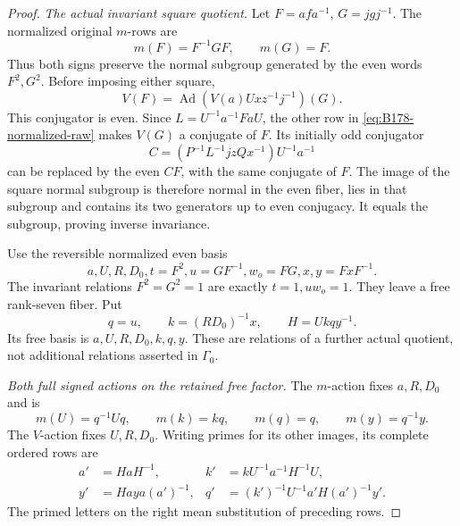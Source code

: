 \begin{proof}
\emph{The actual invariant square quotient.}
Let \(F=afa^{-1}\), \(G=jgj^{-1}\). The normalized original \(m\)-rows are
\[
                     m(F)=F^{-1}GF,\qquad m(G)=F.
\]
Thus both signs preserve the normal subgroup generated by the even
words \(F^2,G^2\). Before imposing either square,
\[
                     V(F)=\operatorname{Ad}(V(a)Uxz^{-1}j^{-1})(G).
\]
This conjugator is even. Since \(L=U^{-1}a^{-1}FaU\), the other row
in \eqref{eq:B178-normalized-raw} makes \(V(G)\) a conjugate of \(F\).
Its initially odd conjugator
\[
                  C=(P^{-1}L^{-1}jzQx^{-1})U^{-1}a^{-1}
\]
can be replaced by the even \(CF\), with the same conjugate of \(F\).
The image of the square normal subgroup is therefore normal in the
even fiber, lies in that subgroup and contains its two generators up
to even conjugacy. It equals the subgroup, proving inverse invariance.

Use the reversible normalized even basis
\[
 a,U,R,D_0,t=F^2,u=GF^{-1},w_o=FG,x,y=FxF^{-1}.
\]
The invariant relations \(F^2=G^2=1\) are exactly \(t=1,uw_o=1\).
They leave a free rank-seven fiber. Put
\[
                 q=u,\qquad k=(RD_0)^{-1}x,\qquad H=Ukqy^{-1}.
\]
Its free basis is \(a,U,R,D_0,k,q,y\). These are relations of a further
actual quotient, not additional relations asserted in \(\Gamma _0\).

\emph{Both full signed actions on the retained free factor.}
The \(m\)-action fixes \(a,R,D_0\) and is
\begin{equation}\label{eq:B178-m-action}
 m(U)=q^{-1}Uq,\qquad m(k)=kq,\qquad m(q)=q,\qquad m(y)=q^{-1}y.
\end{equation}
The \(V\)-action fixes \(U,R,D_0\). Writing primes for its other
images, its complete ordered rows are
\begin{equation}\label{eq:B178-V-action}
\begin{aligned}
 a'&=HaH^{-1},\qquad &k'&=kU^{-1}a^{-1}H^{-1}U,\\
 y'&=Hay a(a')^{-1},&q'&=(k')^{-1}U^{-1}a'H(a')^{-1}y'.
\end{aligned}
\end{equation}
The primed letters on the right mean substitution of preceding rows.


\end{proof}
